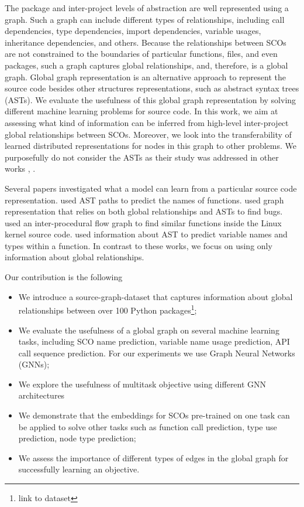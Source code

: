 \documentclass[a4paper,twoside]{article}
\begin{document}
The package and inter-project levels of abstraction are well represented using a graph. Such a graph can include different types of relationships, including call dependencies, type dependencies, import dependencies, variable usages, inheritance dependencies, and others. Because the relationships between SCOs are not constrained to the boundaries of particular functions, files, and even packages, such a graph captures global relationships, and, therefore, is a global graph. Global graph representation is an alternative approach to represent the source code besides other structures representations, such as abstract syntax trees (ASTs). We evaluate the usefulness of this global graph representation by solving different machine learning problems for source code. In this work, we aim at assessing what kind of information can be inferred from high-level inter-project global relationships between SCOs. Moreover, we look into the transferability of learned distributed representations for nodes in this graph to other problems. We purposefully do not consider the ASTs as their study was addressed in other works \cite{Alon2018}, \cite{Yahav2018}.

Several papers investigated what a model can learn from a particular source code representation. \cite{Alon2018a} used AST paths to predict the names of functions. \cite{Allamanis2017} used graph representation that relies on both global relationships and ASTs to find bugs. \cite{DeFreez2018} used an inter-procedural flow graph to find similar functions inside the Linux kernel source code. \cite{Raychev2015} used information about AST to predict variable names and types within a function. In contrast to these works, we focus on using only information about global relationships. 

Our contribution is the following
\begin{itemize}
    \item We introduce a source-graph-dataset that captures information about global relationships between over 100 Python packages\footnote{link to dataset};
    \item We evaluate the usefulness of a global graph on several machine learning tasks, including SCO name prediction, variable name usage prediction, API call sequence prediction. For our experiments we use Graph Neural Networks (GNNs);
    \item We explore the usefulness of multitask objective using different GNN architectures
    \item We demonstrate that the embeddings for SCOs pre-trained on one task can be applied to solve other tasks such as function call prediction, type use prediction, node type prediction;
    \item We assess the importance of different types of edges in the global graph for successfully learning an objective. 
\end{itemize}
\end{document}
